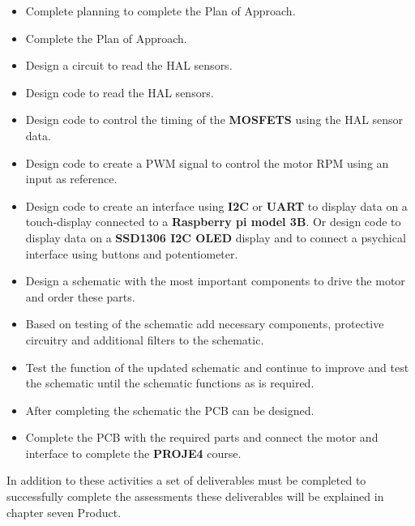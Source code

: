 \begin{itemize}
    \item Complete planning to complete the Plan of Approach.
    \item Complete the Plan of Approach.
    \item Design a circuit to read the HAL sensors.
    \item Design code to read the HAL sensors.
    \item Design code to control the timing of the \textbf{MOSFETS} using the HAL sensor data.
    \item Design code to create a PWM signal to control the motor RPM using an input as reference.
    \item Design code to create an interface using \textbf{I2C} or \textbf{UART} to display data on a touch-display connected to a \textbf{Raspberry pi model 3B}. Or design code to display data on a \textbf{SSD1306 I2C OLED} display and to connect a psychical interface using buttons and potentiometer.
    \item Design a schematic with the most important components to drive the motor and order these parts.
    \item Based on testing of the schematic add necessary components, protective circuitry and additional filters to the schematic.
    \item Test the function of the updated schematic and continue to improve and test the schematic until the schematic functions as is required.
    \item After completing the schematic the PCB can be designed.
    \item Complete the PCB with the required parts and connect the motor and interface to complete the \textbf{PROJE4} course.
\end{itemize}

In addition to these activities a set of deliverables must be completed to successfully complete the assessments these deliverables will be explained in chapter seven Product.

